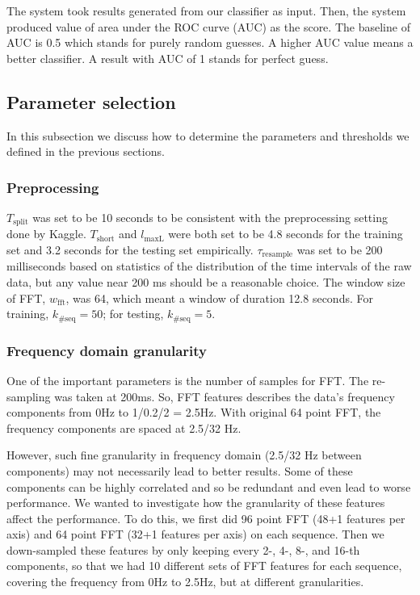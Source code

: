 \documentclass{article} %
\begin{document}
The system took results generated from our classifier as input. Then, the system produced value of area under the ROC curve (AUC) as the score. The baseline of AUC is 0.5 which stands for purely random guesses. A higher AUC value means a better classifier. A result with AUC of 1 stands for perfect guess. 

\subsection{Parameter selection}
In this subsection we discuss how to determine the parameters and thresholds we defined in the previous sections.


\subsubsection{Preprocessing}
$T_\mathrm{split}$ was set to be 10 seconds to be consistent with the preprocessing setting done by Kaggle.  $T_\mathrm{short}$ and $l_\mathrm{maxL}$ were both set to be 4.8 seconds for the training set and 3.2 seconds for the testing set empirically. $\tau_\mathrm{resample}$ was set to be 200 milliseconds based on statistics of the distribution of the time intervals of the raw data, but any value near 200 ms should be a reasonable choice. The window size of FFT, $w_\mathrm{fft}$, was 64, which meant a window of duration 12.8 seconds. For training, $k_\mathrm{\#seq}=50$; for testing, $k_\mathrm{\#seq}=5$.

\subsubsection{Frequency domain granularity}
One of the important parameters is the number of samples for FFT. The re-sampling was taken at 200ms. So, FFT features describes the data's frequency components from 0Hz to 1/0.2/2 = 2.5Hz. With original 64 point FFT, the frequency components are spaced at 2.5/32 Hz. 

However, such fine granularity in frequency domain (2.5/32 Hz between components) may not necessarily lead to better results. Some of these components can be highly correlated and so be redundant and even lead to worse performance. We wanted to investigate how the granularity of these features affect the performance. To do this, we first did 96 point FFT (48+1 features per axis) and 64 point FFT (32+1 features per axis) on each sequence. Then we down-sampled these features by only keeping every 2-, 4-, 8-, and 16-th components, so that we had 10 different sets of FFT features for each sequence, covering the frequency from 0Hz to 2.5Hz, but at different granularities.
\end{document}
